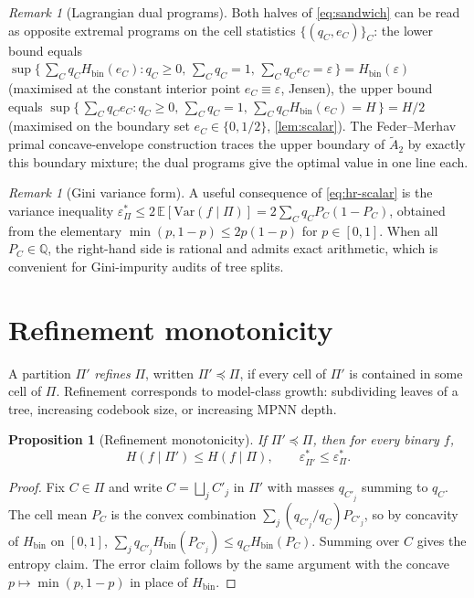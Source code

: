 \documentclass[10pt]{article}
\newtheorem{proposition}[theorem]{Proposition}
\theoremstyle{definition}
\theoremstyle{remark}
\newtheorem{remark}[theorem]{Remark}
\newcommand{\Hbin}{H_{\mathrm{bin}}}
\newcommand{\eps}{\varepsilon}
\newcommand{\epsP}{\eps^{\!*}_{\Pi}}
\newcommand{\E}{\mathbb{E}}
\newcommand{\Var}{\mathrm{Var}}
\newcommand{\Atilde}{\widetilde{A}_{2}}
\begin{document}
\begin{remark}[Lagrangian dual programs]\label{rem:lagrangian}
Both halves of \eqref{eq:sandwich} can be read as opposite
extremal programs on the cell statistics $\{(q_{C}, e_{C})\}_{C}$:
the lower bound equals
\(
  \sup\bigl\{\,\sum_{C} q_{C} \Hbin(e_{C})
    : q_{C} \ge 0,\,\sum_{C} q_{C} = 1,\,\sum_{C} q_{C} e_{C} = \eps\,\bigr\}
  = \Hbin(\eps)
\)
(maximised at the constant interior point $e_{C} \equiv \eps$,
Jensen), the upper bound equals
\(
  \sup\bigl\{\,\sum_{C} q_{C} e_{C}
    : q_{C} \ge 0,\,\sum_{C} q_{C} = 1,\,\sum_{C} q_{C} \Hbin(e_{C}) = H\,\bigr\}
  = H/2
\)
(maximised on the boundary set $e_{C} \in \{0, 1/2\}$,
\cref{lem:scalar}). The Feder--Merhav primal concave-envelope
construction \citep{feder1994} traces the upper boundary of
$\Atilde$ by exactly this boundary mixture; the dual programs
give the optimal value in one line each.
\end{remark}

\begin{remark}[Gini variance form]\label{rem:gini}
A useful consequence of \eqref{eq:hr-scalar} is the variance
inequality $\epsP \le 2\,\E[\Var(f \mid \Pi)] = 2 \sum_{C} q_{C} P_{C} (1 - P_{C})$,
obtained from the elementary $\min(p, 1-p) \le 2 p (1-p)$ for
$p \in [0, 1]$. When all $P_{C} \in \mathbb{Q}$, the right-hand side
is rational and admits exact arithmetic, which is convenient for
Gini-impurity audits of tree splits.
\end{remark}

\section{Refinement monotonicity}\label{sec:refine}

A partition $\Pi'$ \emph{refines} $\Pi$, written $\Pi' \preceq \Pi$,
if every cell of $\Pi'$ is contained in some cell of $\Pi$.
Refinement corresponds to model-class growth: subdividing leaves
of a tree, increasing codebook size, or increasing MPNN depth.

\begin{proposition}[Refinement monotonicity]\label{prop:refine}
If $\Pi' \preceq \Pi$, then for every binary $f$,
\[
  H(f \mid \Pi') \le H(f \mid \Pi),
  \qquad
  \eps^{\!*}_{\Pi'} \le \epsP.
\]
\end{proposition}

\begin{proof}
Fix $C \in \Pi$ and write $C = \bigsqcup_{j} C'_{j}$ in $\Pi'$
with masses $q_{C'_{j}}$ summing to $q_{C}$. The cell mean
$P_{C}$ is the convex combination $\sum_{j} (q_{C'_{j}}/q_{C}) P_{C'_{j}}$,
so by concavity of $\Hbin$ on $[0, 1]$,
\(
  \sum_{j} q_{C'_{j}} \Hbin(P_{C'_{j}}) \le q_{C} \Hbin(P_{C}).
\)
Summing over $C$ gives the entropy claim. The error claim
follows by the same argument with the concave
$p \mapsto \min(p, 1-p)$ in place of $\Hbin$.
\end{proof}
\end{document}
